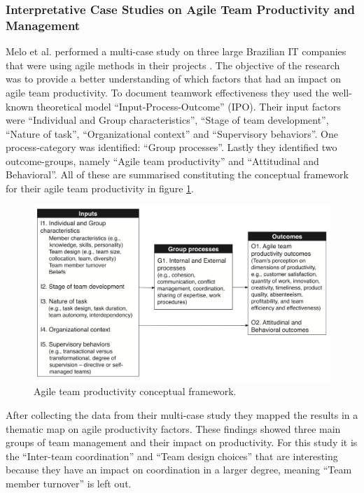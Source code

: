 

\subsubsection{Interpretative Case Studies on Agile Team Productivity and Management}

Melo et al. performed a multi-case study on three large Brazilian IT companies that were using agile methods in their projects \cite{Melo2013}. The objective of the research was to provide a better understanding of which factors that had an impact on agile team productivity. To document teamwork effectiveness they used the well-known theoretical model ``Input-Process-Outcome'' (IPO). Their input factors were ``Individual and Group characteristics'', ``Stage of team development'', ``Nature of task'', ``Organizational context'' and ``Supervisory behaviors''. One process-category was identified: ``Group processes''. Lastly they identified two outcome-groups, namely ``Agile team productivity'' and ``Attitudinal and Behavioral''. All of these are summarised constituting the conceptual framework for their agile team productivity in figure \ref{atpcf}.

\begin{figure}[ht!]
\centering
\includegraphics[width=150mm]{images/IPO.png}
\caption{Agile team productivity conceptual framework.}
\label{atpcf}
\end{figure}

After collecting the data from their multi-case study they mapped the results in a thematic map on agile productivity factors. These findings showed three main groups of team management and their impact on productivity. For this study it is the ``Inter-team coordination'' and ``Team design choices'' that are interesting because they have an impact on coordination in a larger degree, meaning ``Team member turnover'' is left out. 

